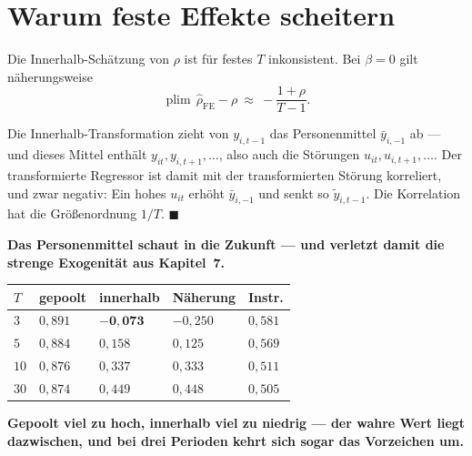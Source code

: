 \section{Warum feste Effekte scheitern}

\begin{merksatz}
Die Innerhalb-Schätzung von $\rho$ ist für festes $T$ inkonsistent. Bei $\beta = 0$ gilt näherungsweise
\[ \operatorname{plim}\,\hat\rho_{\text{FE}} - \rho \ \approx\ -\frac{1+\rho}{T-1} . \]

Die Innerhalb-Transformation zieht von $y_{i,t-1}$ das Personenmittel $\bar y_{i,-1}$ ab --- und dieses Mittel enthält $y_{it}, y_{i,t+1},\ldots$, also auch die Störungen $u_{it}, u_{i,t+1},\ldots$. Der transformierte Regressor ist damit mit der transformierten Störung korreliert, und zwar negativ: Ein hohes $u_{it}$ erhöht $\bar y_{i,-1}$ und senkt so $\tilde y_{i,t-1}$. Die Korrelation hat die Größenordnung $1/T$. $\blacksquare$

\begin{center}
\begin{minipage}{0.9\textwidth}
\textbf{Das Personenmittel schaut in die Zukunft --- und verletzt damit die strenge Exogenität aus Kapitel~7.}
\end{minipage}
\end{center}

\begin{center}
{\small
\renewcommand{\arraystretch}{1.48}
\begin{tabular}{@{}P{1.2cm}P{1.8cm}P{1.8cm}P{1.8cm}P{1.8cm}@{}}
\toprule
$T$ & \textbf{gepoolt} & \textbf{innerhalb} & \textbf{Näherung} & \textbf{Instr.}\\
\midrule
$3$ & $0{,}891$ & $\mathbf{-0{,}073}$ & $-0{,}250$ & $0{,}581$\\
$5$ & $0{,}884$ & $0{,}158$ & $0{,}125$ & $0{,}569$\\
$10$ & $0{,}876$ & $0{,}337$ & $0{,}333$ & $0{,}511$\\
$30$ & $0{,}874$ & $0{,}449$ & $0{,}448$ & $0{,}505$\\
\bottomrule
\end{tabular}}
\end{center}

\begin{center}
\begin{minipage}{0.9\textwidth}
\textbf{Gepoolt viel zu hoch, innerhalb viel zu niedrig --- der wahre Wert liegt dazwischen, und bei drei Perioden kehrt sich sogar das Vorzeichen um.}
\end{minipage}
\end{center}


\end{merksatz}
